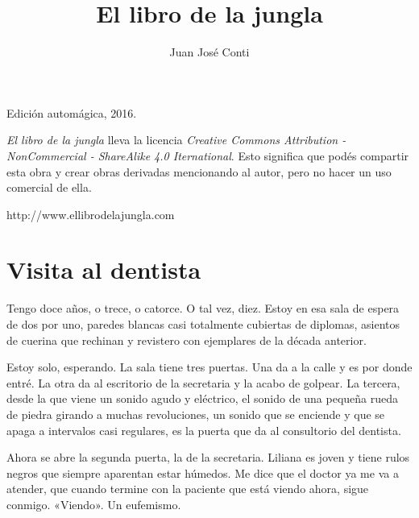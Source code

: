 \documentclass[11pt,twoside,openright]{book}
\title{El libro de la jungla}
\author{Juan José Conti}
\date{}
\begin{document}
\pagestyle{plain}


%
%

\maketitle

\cleardoublepage

\thispagestyle{empty}
\noindent
Edición automágica, 2016.\\

\vspace{0.5cm}

\noindent
\emph{El libro de la jungla} lleva la licencia
\emph{Creative Commons Attribution - NonCommercial - ShareAlike 4.0 Iternational}.
Esto significa que podés compartir esta obra y crear obras derivadas
mencionando al autor, pero no ha\-cer un uso comercial de ella.

\vfill

\noindent
http://www.ellibrodelajungla.com\\

\cleardoublepage


\renewcommand*\contentsname{Índice}

\tableofcontents



\chapter*{Visita al dentista}  
 Tengo doce años, o trece, o catorce. O tal vez, diez. Estoy en esa sala de
 espera de dos por uno, paredes blancas casi totalmente cubiertas de diplomas,
 asientos de cuerina que rechinan y revistero con ejemplares de la década
 anterior.
 
 Estoy solo, esperando. La sala tiene tres puertas. Una da a la calle y es por
 donde entré. La otra da al escritorio de la secretaria y la acabo de golpear.
 La tercera, desde la que viene un sonido agudo y eléctrico, el sonido de una
 pequeña rueda de piedra girando a muchas revoluciones, un sonido que se
 enciende y que se apaga a intervalos casi regulares, es la puerta que da al
 consultorio del dentista.
 
 Ahora se abre la segunda puerta, la de la secretaria. Liliana es joven y tiene
 rulos negros que siempre aparentan estar húmedos. Me dice que el doctor ya me
 va a atender, que cuando termine con la paciente que está viendo ahora, sigue
 conmigo. «Viendo». Un eufemismo.
 
\end{document}
